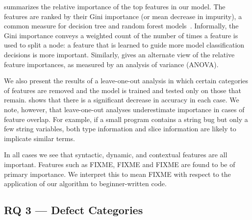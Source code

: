 \documentclass[conference]{IEEEtran}
\begin{document}
 summarizes the relative importance
of the top features in our model. The features are ranked by their
Gini importance (or mean decrease in impurity), a common measure
for decision tree and random forest models~\cite{breiman2001random}. Informally, the
Gini importance conveys a weighted count of the number of times a feature
is used to split a node: a feature that is learned to guide more model
classification decisions is more important. Similarly,  gives
an alternate view of the relative feature importances, as measured by an
analysis of variance (ANOVA).

We also present the results of a leave-one-out analysis in which
certain categories of features are removed and the model is trained
and tested only on those that remain.  shows
that there is a significant decrease in accuracy in each case. We note,
however, that leave-one-out analyses underestimate importance in cases of
feature overlap. For example, if a small program contains a string bug but
only a few string variables, both type information and slice information
are likely to implicate similar terms.

In all cases we see that syntactic, dynamic, and contextual features are
all important. Features such as FIXME, FIXME and FIXME are found to be of
primary importance. We interpret this to mean FIXME with respect to the
application of our algorithm to beginner-written code.







\subsection{RQ 3 --- Defect Categories}
\end{document}
